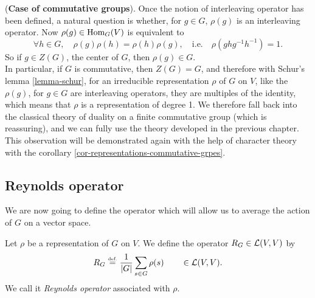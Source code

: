  
\begin{rem}{(\upshape \textbf{Case of commutative groups}).}
 \label{notation-85} Once the notion of interleaving operator has been defined, a natural question is whether, for $ g \in G $, $ \rho (g ) $ is an interleaving operator. Now $ \rho (g) \in \operatorname{Hom}_G (V) $ is equivalent to
\begin{equation*}
\forall h \in G, \quad \rho (g) \rho (h) = \rho (h) \rho (g), \quad \text{i.e.} \quad \rho (ghg^{-1} h^{-1}) = 1.
\end{equation*}
So if $ g \in Z (G) $, the center of $G$, then $ \rho (g) \in G $. \\In particular, if $G$ is commutative, then $ Z (G) = G $, and therefore with Schur's lemma \ref{lemma-schur}, for an irreducible representation $ \rho $ of $G$ on $V$, like the $ \rho (g) $, for $ g \in G $ are interleaving operators, they are multiples of the identity, which means that $ \rho $ is a representation of degree 1. We therefore fall back into the classical theory of duality on a finite commutative group (which is reassuring), and we can fully use the theory developed in the previous chapter. This observation will be demonstrated again with the help of character theory with the corollary \ref{cor-representations-commutative-grpes}.
\end{rem}
 
\subsection{Reynolds operator}
\label{sect2-operator-reynolds}
 
We are now going to define the operator which will allow us to average the action of $G$ on a vector space. 
 
\begin{defn}
\label{defn-operator-reynolds}
\label{notation-86} Let $ \rho $ be a representation of $G$ on $V$. We define the operator $ R_G \in \mathcal{L} (V, V) $ by
\begin{equation*}
R_G \stackrel{\mbox{\upshape\tiny def.}}{=} \frac{1}{|G|} \sum_{s \in G}{\rho (s)} \quad \quad \in \mathcal{L} (V, V).
\end{equation*}
We call it \textit{Reynolds operator} associated with $ \rho $.
\end{defn}
 
